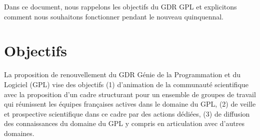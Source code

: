 \documentclass[11pt]{article}
\newcommand{\mynote}[3][black]{\textcolor{#1}{\fbox{\bfseries\sffamily\scriptsize{#2}}
{\small$\blacktriangleright$\textsf{\emph{#3}}$\blacktriangleleft$}}}
\newcommand{\TODO}[1]{\mynote[red]{TODO}{#1}}
\newcommand{\gpl}[0]{génie de la programmation et du logiciel}
\begin{document}

%


%

Dans ce document, nous rappelons les objectifs du GDR GPL et explicitons comment nous souhaitons fonctionner pendant le nouveau quinquennal. 


\section{Objectifs}
La proposition de renouvellement du GDR Génie de la Programmation et du
Logiciel (GPL) vise des objectifs (1)  d'animation de la communauté scientifique
avec la proposition d'un cadre structurant pour un ensemble de groupes de
travail qui réunissent les équipes françaises actives dans le domaine du GPL, (2) de veille et prospective scientifique dans ce cadre par des actions dédiées, (3) de diffusion des connaissances du domaine du GPL y compris en articulation avec d'autres domaines.
\end{document}
